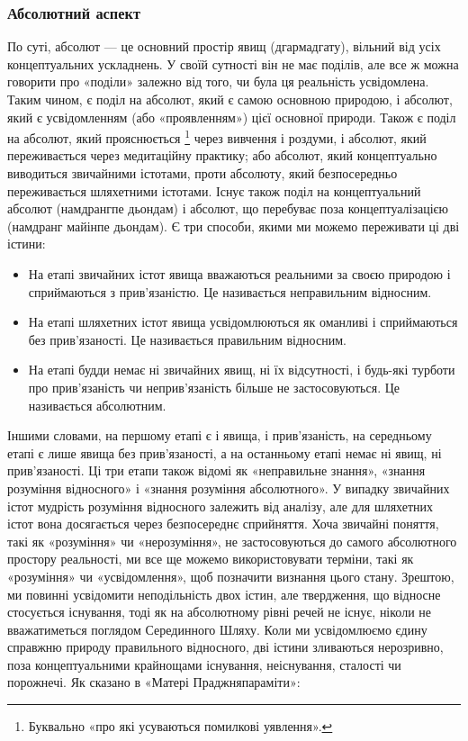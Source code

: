 \documentclass{article}
\begin{document}
\subsubsection{Абсолютний аспект}

По суті, абсолют — це основний простір явищ (дгармадгату), вільний від усіх концептуальних ускладнень. У своїй сутності він не має поділів, але все ж можна говорити про «поділи» залежно від того, чи була ця реальність усвідомлена. Таким чином, є поділ на абсолют, який є самою основною природою, і абсолют, який є усвідомленням (або «проявленням») цієї основної природи. Також є поділ на абсолют, який прояснюється \footnote{Буквально «про які усуваються помилкові уявлення».} через вивчення і роздуми, і абсолют, який переживається через медитаційну практику; або абсолют, який концептуально виводиться звичайними істотами, проти абсолюту, який безпосередньо переживається шляхетними істотами. Існує також поділ на концептуальний абсолют (намдрангпе дьондам) і абсолют, що перебуває поза концептуалізацією (намдранг майінпе дьондам). Є три способи, якими ми можемо переживати ці дві істини:

\begin{itemize}
\item На етапі звичайних істот явища вважаються реальними за своєю природою і сприймаються з прив’язаністю. Це називається неправильним відносним.
\item На етапі шляхетних істот явища усвідомлюються як оманливі і сприймаються без прив’язаності. Це називається правильним відносним.
\item На етапі будди немає ні звичайних явищ, ні їх відсутності, і будь-які турботи про прив’язаність чи неприв’язаність більше не застосовуються. Це називається абсолютним.
\end{itemize}

Іншими словами, на першому етапі є і явища, і прив’язаність, на середньому етапі є лише явища без прив’язаності, а на останньому етапі немає ні явищ, ні прив’язаності. Ці три етапи також відомі як «неправильне знання», «знання розуміння відносного» і «знання розуміння абсолютного». У випадку звичайних істот мудрість розуміння відносного залежить від аналізу, але для шляхетних істот вона досягається через безпосереднє сприйняття. Хоча звичайні поняття, такі як «розуміння» чи «нерозуміння», не застосовуються до самого абсолютного простору реальності, ми все ще можемо використовувати терміни, такі як «розуміння» чи «усвідомлення», щоб позначити визнання цього стану. Зрештою, ми повинні усвідомити неподільність двох істин, але твердження, що відносне стосується існування, тоді як на абсолютному рівні речей не існує, ніколи не вважатиметься поглядом Серединного Шляху. Коли ми усвідомлюємо єдину справжню природу правильного відносного, дві істини зливаються нерозривно, поза концептуальними крайнощами існування, неіснування, сталості чи порожнечі. Як сказано в «Матері Праджняпараміти»:
\end{document}
